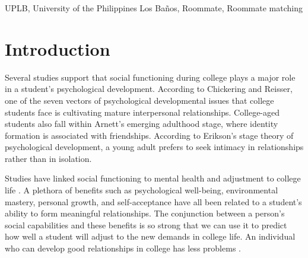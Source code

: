 \documentclass[journal]{./IEEE/IEEEtran}
\title{\SPTITLE}
\author{\ADVISEE~and~\ADVISER%
\REMARK
}
\newcommand{\UPLB}{University of the Philippines Los Ba\~{n}os }
\begin{document}
\maketitle

\begin{abstract}
This article explores the role and significance of roommates in a college student's development - from the initial adaptation with the roommate setting, to their academic performance and life after college. We highlight the importance of finding the proper roommates so that a student can maximize their psychological development, get higher grades, and develop open-mindedness. We also propose a solution in the form of a web application that can help \UPLB students find mutually beneficial roommates for their college life. This solution also extends itself to solve the dorm-finding problem students experience at the start of every semester.
\end{abstract}

\begin{keywords}
UPLB, University of the Philippines Los Ba\~{n}os, Roommate, Roommate matching
\end{keywords}

\section{Introduction}

Several studies support that social functioning during college plays a major role in a student's psychological development. According to Chickering and Reisser, one of the seven vectors of psychological developmental issues that college students face is cultivating mature interpersonal relationships\cite{chickering}. College-aged students also fall within Arnett's emerging adulthood stage, where identity formation is associated with friendships\cite{erb}. According to Erikson's stage theory of psychological development, a young adult prefers to seek intimacy in relationships rather than in isolation\cite{erikson}.

Studies have linked social functioning to mental health and adjustment to college life \cite{erb}. A plethora of benefits such as psychological well-being, environmental mastery, personal growth, and self-acceptance have all been related to a student's ability to form meaningful relationships\cite{erb}. The conjunction between a person{'}s social capabilities and these benefits is so strong that we can use it to predict how well a student  will adjust to the new demands in college life. An individual who can develop good relationships in college has less problems \cite{erb}.
\end{document}

